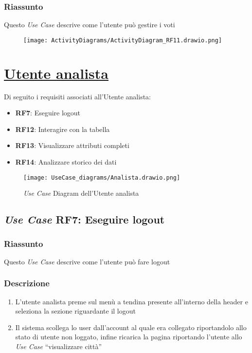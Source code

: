         \subsubsection{Riassunto}
            Questo \textit{Use Case} descrive come l'utente può gestire i voti
             \begin{figure}[H]
                 \texttt{[image: ActivityDiagrams/ActivityDiagram\_RF11.drawio.png]}
             \end{figure}


\section{\texorpdfstring{\underline{Utente analista}}{Utente analista}}
    Di seguito i requisiti associati all'Utente analista:
    \begin{itemize}
        \item \textbf{RF7}: Eseguire logout
        \item \textbf{RF12}: Interagire con la tabella
        \item \textbf{RF13}: Visualizzare attributi completi
        \item \textbf{RF14}: Analizzare storico dei dati
    \end{itemize}
    \begin{figure}[H]
        \centering
        \texttt{[image: UseCase\_diagrams/Analista.drawio.png]}
        \caption{\textit{Use Case} Diagram dell'Utente analista}
    \end{figure}

    \subsection{\textit{Use Case} RF7: Eseguire logout}
        \subsubsection{Riassunto}
            Questo \textit{Use Case} descrive come l'utente può fare logout
        \subsubsection{Descrizione}
            \begin{enumerate}
                \item L'utente analista preme sul menù a tendina presente all'interno della header e seleziona la sezione riguardante il logout
                \item Il sistema scollega lo user dall'account al quale era collegato riportandolo allo stato di utente non loggato, infine 
                ricarica la pagina riportando l'utente allo \textit{Use Case} ``visualizzare città''
            \end{enumerate}

